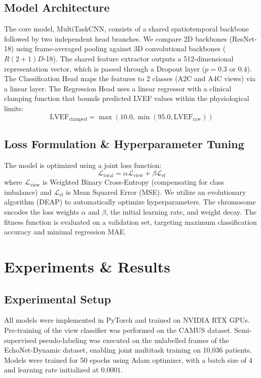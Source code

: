 \documentclass[journal]{IEEEtran}
\begin{document}
\subsection{Model Architecture}
The core model, MultiTaskCNN, consists of a shared spatiotemporal backbone followed by two independent head branches. We compare 2D backbones (ResNet-18) using frame-averaged pooling against 3D convolutional backbones ($R(2+1)D$-18). The shared feature extractor outputs a 512-dimensional representation vector, which is passed through a Dropout layer ($p=0.3$ or $0.4$). The Classification Head maps the features to 2 classes (A2C and A4C views) via a linear layer. The Regression Head uses a linear regressor with a clinical clamping function that bounds predicted LVEF values within the physiological limits:
\begin{equation}
\text{LVEF}_{\text{clamped}} = \max(10.0, \min(95.0, \text{LVEF}_{\text{raw}}))
\end{equation}

\subsection{Loss Formulation \& Hyperparameter Tuning}
The model is optimized using a joint loss function:
\begin{equation}
\mathcal{L}_{\text{total}} = \alpha \mathcal{L}_{\text{view}} + \beta \mathcal{L}_{\text{ef}}
\end{equation}
where $\mathcal{L}_{\text{view}}$ is Weighted Binary Cross-Entropy (compensating for class imbalance) and $\mathcal{L}_{\text{ef}}$ is Mean Squared Error (MSE). We utilize an evolutionary algorithm (DEAP) to automatically optimize hyperparameters. The chromosome encodes the loss weights $\alpha$ and $\beta$, the initial learning rate, and weight decay. The fitness function is evaluated on a validation set, targeting maximum classification accuracy and minimal regression MAE.

\section{Experiments \& Results}

\subsection{Experimental Setup}
All models were implemented in PyTorch and trained on NVIDIA RTX GPUs. Pre-training of the view classifier was performed on the CAMUS dataset. Semi-supervised pseudo-labeling was executed on the unlabelled frames of the EchoNet-Dynamic dataset, enabling joint multitask training on 10,036 patients. Models were trained for 50 epochs using Adam optimizer, with a batch size of 4 and learning rate initialized at $0.0001$.
\end{document}
